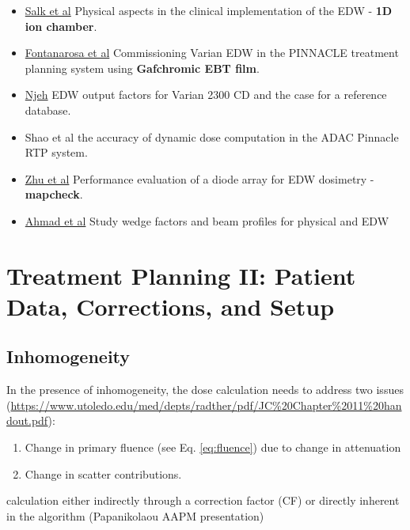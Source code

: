 \documentclass[]{book}
\providecommand{\tightlist}{%
  \setlength{\itemsep}{0pt}\setlength{\parskip}{0pt}}
\theoremstyle{definition}
\theoremstyle{definition}
\theoremstyle{definition}
\theoremstyle{remark}
\begin{document}
\begin{itemize}
\tightlist
\item
  \href{http://www.uni-ulm.de/~jsalk/edw/edw.pdf}{Salk et al} Physical
  aspects in the clinical implementation of the EDW - \textbf{1D ion
  chamber}.
\item
  \href{https://www.ncbi.nlm.nih.gov/pubmed/19928081}{Fontanarosa et al}
  Commissioning Varian EDW in the PINNACLE treatment planning system
  using \textbf{Gafchromic EBT film}.
\item
  \href{http://onlinelibrary.wiley.com/doi/10.1120/jacmp.v16i5.5498/full}{Njeh}
  EDW output factors for Varian 2300 CD and the case for a reference
  database.
\item
  Shao et al the accuracy of dynamic dose computation in the ADAC
  Pinnacle RTP system.
\item
  \href{http://onlinelibrary.wiley.com/doi/10.1118/1.598019/epdf}{Zhu et
  al} Performance evaluation of a diode array for EDW dosimetry -
  \textbf{mapcheck}.
\item
  \href{http://www.jmp.org.in/article.asp?issn=0971-6203;year=2010;volume=35;issue=1;spage=33;epage=41;aulast=Ahmad}{Ahmad
  et al} Study wedge factors and beam profiles for physical and EDW
\end{itemize}

\chapter{Treatment Planning II: Patient Data, Corrections, and
Setup}\label{planning2}

\section{Inhomogeneity}\label{inhomogeneity}

In the presence of inhomogeneity, the dose calculation needs to address
two issues
(\url{https://www.utoledo.edu/med/depts/radther/pdf/JC\%20Chapter\%2011\%20handout.pdf}):

\begin{enumerate}
\def\labelenumi{\arabic{enumi}.}
\tightlist
\item
  Change in primary fluence (see Eq. \eqref{eq:fluence}) due to change in
  attenuation
\item
  Change in scatter contributions.
\end{enumerate}

calculation either indirectly through a correction factor (CF) or
directly inherent in the algorithm (Papanikolaou AAPM presentation)
\end{document}
